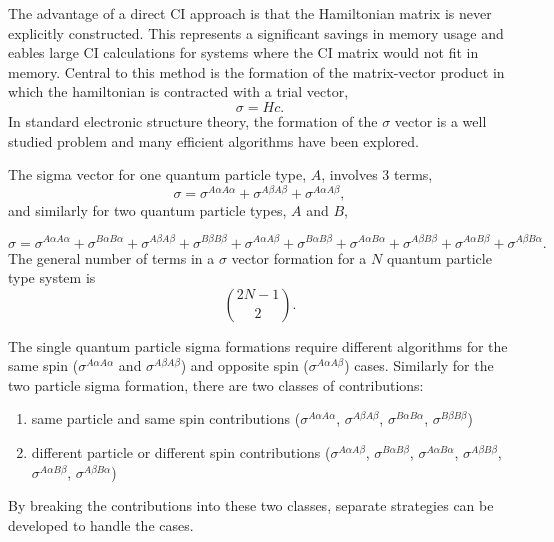The advantage of a direct CI approach is that the Hamiltonian matrix is never explicitly constructed.
This represents a significant savings in memory usage and eables large CI calculations for systems where the CI matrix would not fit in memory. Central to this method is the formation of the matrix-vector product in which the hamiltonian is contracted with a trial vector,
\begin{equation}
    \sigma = H c.
\end{equation}
In standard electronic structure theory, the formation of the $\sigma$ vector is a well studied problem and many efficient algorithms have been explored.\citehere

The sigma vector for one quantum particle type, $A$, involves 3 terms,
\begin{equation}
    \sigma = 
    \sigma^{A \alpha A \alpha} +
    \sigma^{A \beta A \beta} +
    \sigma^{A \alpha A \beta},
\end{equation}
and similarly for two quantum particle types, $A$ and $B$, 

\begin{equation}
    \sigma = 
    \sigma^{A \alpha A \alpha} +
    \sigma^{B \alpha B \alpha} +
    \sigma^{A \beta A \beta} +
    \sigma^{B \beta B \beta} +
    \sigma^{A \alpha A \beta} +
    \sigma^{B \alpha B \beta} +
    \sigma^{A \alpha B \alpha} +
    \sigma^{A \beta B \beta} +
    \sigma^{A \alpha B \beta} +
    \sigma^{A \beta B \alpha}.
\end{equation}
The general number of terms in a $\sigma$ vector formation for a $N$ quantum particle type system is 
\begin{equation}
    \binom{2N -1}{2}.
\end{equation}

The single quantum particle sigma formations require different algorithms for the same spin ($\sigma^{A\alpha A\alpha}$ and $\sigma^{A\beta A\beta}$) and opposite spin ($\sigma^{A\alpha A\beta}$) cases.
Similarly for the two particle sigma formation, there are two classes of contributions:
\begin{enumerate}
    \item same particle and same spin contributions ($\sigma^{A\alpha A\alpha}$, $\sigma^{A\beta A\beta}$, $\sigma^{B\alpha B\alpha}$, $\sigma^{B\beta B\beta}$)
    \item different particle or different spin contributions ($\sigma^{A\alpha A\beta}$, $\sigma^{B\alpha B\beta}$, $\sigma^{A\alpha B\alpha}$, $\sigma^{A\beta B\beta}$, $\sigma^{A\alpha B\beta}$, $\sigma^{A\beta B\alpha}$)
\end{enumerate}
By breaking the contributions into these two classes, separate strategies can be developed to handle the cases.

